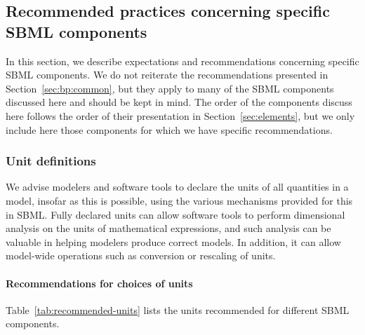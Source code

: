 \subsection{Recommended practices concerning specific SBML components}
\label{sec:bp:specifics}

In this section, we describe expectations and recommendations
concerning specific SBML components.  We do not reiterate the
recommendations presented in Section~\ref{sec:bp:common}, but they
apply to many of the SBML components discussed here and should be
kept in mind.  The order of the components discuss here follows
the order of their presentation in Section~\ref{sec:elements}, but
we only include here those components for which we have specific
recommendations.


\subsubsection{Unit definitions}
\label{sec:bp:unitdefinitions}

We advise modelers and software tools to declare the units of all
quantities in a model, insofar as this is possible, using the
various mechanisms provided for this in SBML.  Fully declared
units can allow software tools to perform dimensional analysis on
the units of mathematical expressions, and such analysis can be
valuable in helping modelers produce correct models.  In addition,
it can allow model-wide operations such as conversion or rescaling
of units.


\paragraph{Recommendations for choices of units}
\label{sec:bp:unitdefinitions:recommendedunits}

Table~\ref{tab:recommended-units} lists the units recommended for
different SBML components.

